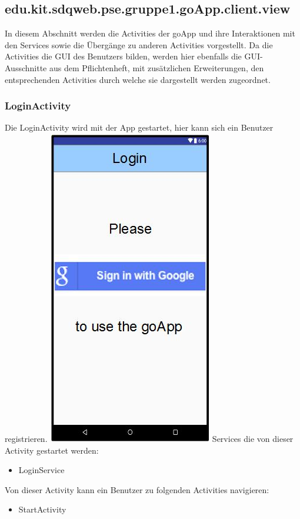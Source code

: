 	\subsection{edu.kit.sdqweb.pse.gruppe1.goApp.client.view}
	In diesem Abschnitt werden die Activities der goApp und ihre Interaktionen mit den Services sowie die Übergänge zu anderen Activities vorgestellt.
	Da die Activities die GUI des Benutzers bilden, werden hier ebenfalls die GUI-Ausschnitte aus dem Pflichtenheft, mit zusätzlichen Erweiterungen, den entsprechenden Activities durch welche sie dargestellt werden zugeordnet.  
	\subsubsection {LoginActivity}
	Die LoginActivity wird mit der App gestartet, hier kann sich ein Benutzer registrieren.
	\newline
	\includegraphics[width=.3\textwidth]{GUI_Login.jpg}
	\newline
	Services die von dieser Activity gestartet werden:
	\begin{itemize}
	\item LoginService
	\end{itemize}
	Von dieser Activity kann ein Benutzer zu folgenden Activities navigieren:
	\begin{itemize} 
	 \item StartActivity
	\end{itemize}
	
